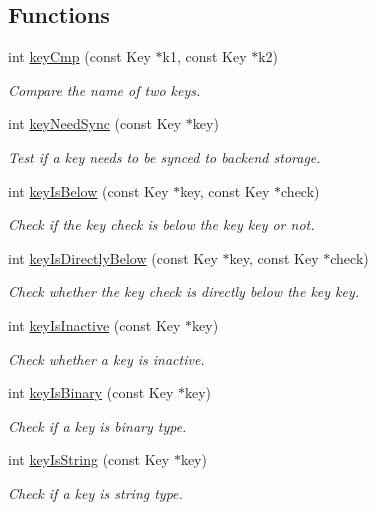 \subsection*{Functions}
\begin{DoxyCompactItemize}
\item 
int \hyperlink{group__keytest_gaf6e66e12fe04d535a5d1c8218ced803e}{key\+Cmp} (const Key $\ast$k1, const Key $\ast$k2)
\begin{DoxyCompactList}\small\item\em Compare the name of two keys. \end{DoxyCompactList}\item 
int \hyperlink{group__keytest_gaf247df0de7aca04b32ef80e39ef12950}{key\+Need\+Sync} (const Key $\ast$key)
\begin{DoxyCompactList}\small\item\em Test if a key needs to be synced to backend storage. \end{DoxyCompactList}\item 
int \hyperlink{group__keytest_ga03332b5d97c76a4fd2640aca4762b8df}{key\+Is\+Below} (const Key $\ast$key, const Key $\ast$check)
\begin{DoxyCompactList}\small\item\em Check if the key check is below the key key or not. \end{DoxyCompactList}\item 
int \hyperlink{group__keytest_ga0150fb549225d8789e7297b919965e72}{key\+Is\+Directly\+Below} (const Key $\ast$key, const Key $\ast$check)
\begin{DoxyCompactList}\small\item\em Check whether the key {\ttfamily check} is directly below the key {\ttfamily key}. \end{DoxyCompactList}\item 
int \hyperlink{group__keytest_gaa25f699f592031c1a0abc1504d14e13e}{key\+Is\+Inactive} (const Key $\ast$key)
\begin{DoxyCompactList}\small\item\em Check whether a key is inactive. \end{DoxyCompactList}\item 
int \hyperlink{group__keytest_ga9526b371087564e43e3dff8ad0dac949}{key\+Is\+Binary} (const Key $\ast$key)
\begin{DoxyCompactList}\small\item\em Check if a key is binary type. \end{DoxyCompactList}\item 
int \hyperlink{group__keytest_gaea7670778abd07fee0fe8ac12a149190}{key\+Is\+String} (const Key $\ast$key)
\begin{DoxyCompactList}\small\item\em Check if a key is string type. \end{DoxyCompactList}\end{DoxyCompactItemize}


